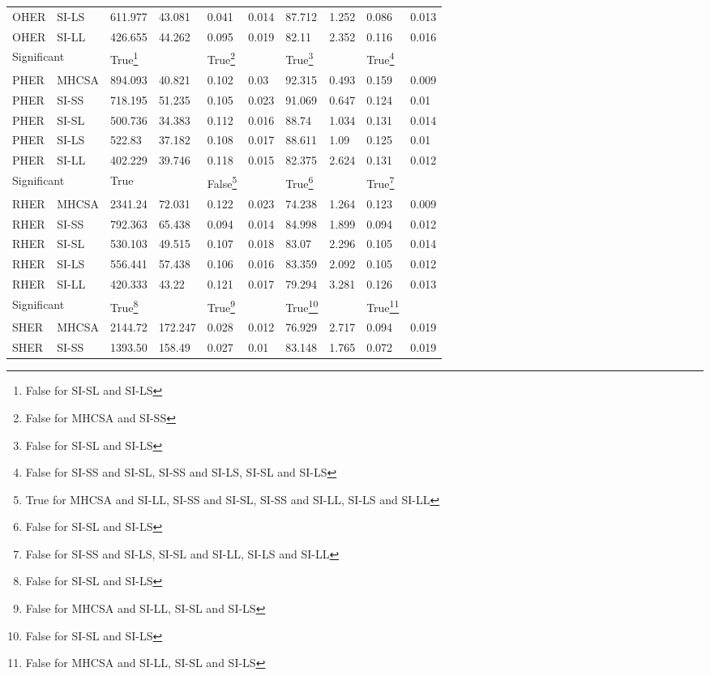 \begin{table}[H]
\begin{minipage}{\textwidth}
\begin{tabular}{llllllllll}
		OHER & SI-LS & 611.977 & 43.081 & 0.041 & 0.014 & 87.712 & 1.252 & 0.086 & 0.013 \\ 
		OHER & SI-LL & 426.655 & 44.262 & 0.095 & 0.019 & 82.11 & 2.352 & 0.116 & 0.016 \\ 
		\multicolumn{2}{l}{Significant} & True\footnote{False for SI-SL and SI-LS} & & True\footnote{False for MHCSA and SI-SS} & & True\footnote{False for SI-SL and SI-LS} & & True\footnote{False for SI-SS and SI-SL, SI-SS and SI-LS, SI-SL and SI-LS} & \\ 
		\midrule
		PHER & MHCSA & 894.093 & 40.821 & 0.102 & 0.03 & 92.315 & 0.493 & 0.159 & 0.009 \\ 
		PHER & SI-SS & 718.195 & 51.235 & 0.105 & 0.023 & 91.069 & 0.647 & 0.124 & 0.01 \\ 
		PHER & SI-SL & 500.736 & 34.383 & 0.112 & 0.016 & 88.74 & 1.034 & 0.131 & 0.014 \\ 
		PHER & SI-LS & 522.83 & 37.182 & 0.108 & 0.017 & 88.611 & 1.09 & 0.125 & 0.01 \\ 
		PHER & SI-LL & 402.229 & 39.746 & 0.118 & 0.015 & 82.375 & 2.624 & 0.131 & 0.012 \\ 
		\multicolumn{2}{l}{Significant} & True & & False\footnote{True for MHCSA and SI-LL, SI-SS and SI-SL, SI-SS and SI-LL, SI-LS and SI-LL} & & True\footnote{False for SI-SL and SI-LS} & & True\footnote{False for SI-SS and SI-LS, SI-SL and SI-LL, SI-LS and SI-LL} & \\ 
		\midrule
		RHER & MHCSA & 2341.24 & 72.031 & 0.122 & 0.023 & 74.238 & 1.264 & 0.123 & 0.009 \\ 
		RHER & SI-SS & 792.363 & 65.438 & 0.094 & 0.014 & 84.998 & 1.899 & 0.094 & 0.012 \\ 
		RHER & SI-SL & 530.103 & 49.515 & 0.107 & 0.018 & 83.07 & 2.296 & 0.105 & 0.014 \\ 
		RHER & SI-LS & 556.441 & 57.438 & 0.106 & 0.016 & 83.359 & 2.092 & 0.105 & 0.012 \\ 
		RHER & SI-LL & 420.333 & 43.22 & 0.121 & 0.017 & 79.294 & 3.281 & 0.126 & 0.013 \\ 
		\multicolumn{2}{l}{Significant} & True\footnote{False for SI-SL and SI-LS} & & True\footnote{False for MHCSA and SI-LL, SI-SL and SI-LS} & & True\footnote{False for SI-SL and SI-LS} & & True\footnote{False for MHCSA and SI-LL, SI-SL and SI-LS} & \\ 
		\midrule
		SHER & MHCSA & 2144.72 & 172.247 & 0.028 & 0.012 & 76.929 & 2.717 & 0.094 & 0.019 \\ 
		SHER & SI-SS & 1393.50 & 158.49 & 0.027 & 0.01 & 83.148 & 1.765 & 0.072 & 0.019 \\ 

\end{tabular}
\end{minipage}
\end{table}
